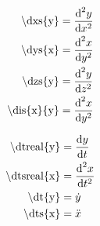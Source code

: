 \begin{subequations}
\begin{align}
\textrm{\textbackslash dxs\{y\}}            & = \frac{\textrm{d}^2 y}{\textrm{d}x^2}             \label{eqn:dxs} \\
\textrm{\textbackslash dys\{x\}}            & = \frac{\textrm{d}^2 x}{\textrm{d}y^2}             \label{eqn:dys} \\
\textrm{\textbackslash dzs\{y\}}            & = \frac{\textrm{d}^2 y}{\textrm{d}z^2}             \label{eqn:dzs} \\
\textrm{\textbackslash dis\{x\}\{y\}}       & = \frac{\textrm{d}^2 x}{\textrm{d}y^2}          \label{eqn:dis}
\end{align}
\end{subequations}

\begin{subequations}
\begin{align}
\textrm{\textbackslash dtreal\{y\}}         & = \frac{\textrm{d} y}{\textrm{d} t}          \label{eqn:dtreal} \\
\textrm{\textbackslash dtsreal\{x\}}        & = \frac{\textrm{d}^2 x}{\textrm{d}t^2}         \label{eqn:dtsreal} \\
\textrm{\textbackslash dt\{y\}}             & = \dot{y}              \label{eqn:dt} \\
\textrm{\textbackslash dts\{x\}}            & = \ddot{x}             \label{eqn:dts}
\end{align}
\end{subequations}

